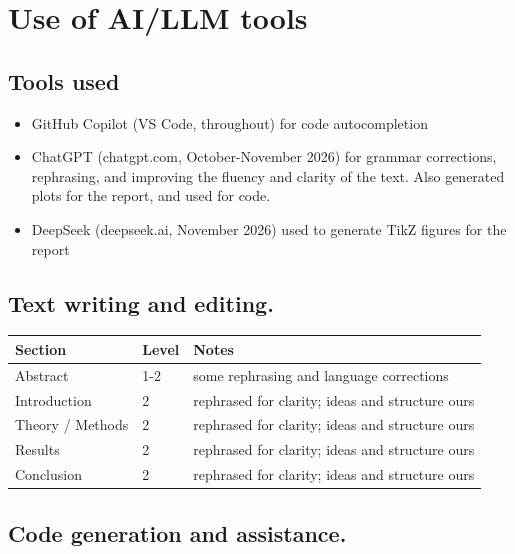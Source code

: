 \documentclass[amssymb,secnumarabic,twocolumn,aps]{revtex4}
\begin{document}
\section{Use of AI/LLM tools}
\subsection{Tools used}
\begin{itemize}
    \item GitHub Copilot (VS Code, throughout) for code autocompletion
    \item ChatGPT (chatgpt.com, October-November 2026) for grammar corrections, rephrasing, and improving the fluency and clarity of the text. Also generated plots for the report, and used for code.
    \item DeepSeek (deepseek.ai, November 2026) used to generate TikZ figures for the report
\end{itemize}

\subsection{Text writing and editing.}
\begin{tabular}{llp{7cm}}
    Section          & Level & Notes                                           \\ \hline
    Abstract         & 1-2   & some rephrasing and language corrections        \\
    Introduction     & 2     & rephrased for clarity; ideas and structure ours \\
    Theory / Methods & 2     & rephrased for clarity; ideas and structure ours \\
    Results          & 2     & rephrased for clarity; ideas and structure ours \\
    Conclusion       & 2     & rephrased for clarity; ideas and structure ours \\
\end{tabular}

\subsection{Code generation and assistance.}
\end{document}
